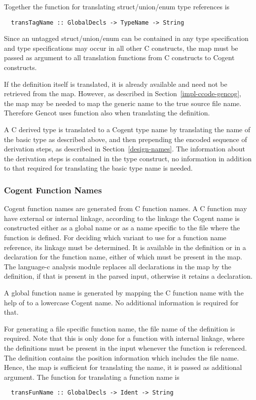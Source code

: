 Together the function for translating struct/union/enum type references is
\begin{verbatim}
  transTagName :: GlobalDecls -> TypeName -> String
\end{verbatim}

Since an untagged struct/union/enum can be contained in any type specification and type specifications
may occur in all other C constructs, the  map must be passed as argument to all translation
functions from C constructs to Cogent constructs.

If the definition itself is translated, it is already available and need not be retrieved from the map. 
However, as described in Section~\ref{impl-ccode-gencog}, the map may be needed to map the generic name
 to the true source file name. Therefore Gencot uses function  also when
translating the definition.

A C derived type is translated to a Cogent type name by translating the name of the basic type as described
above, and then prepending the encoded sequence of derivation steps, as
described in Section~\ref{design-names}. The information about the derivation steps is contained in the 
type construct, no information in addition to that required for translating the basic type name is needed.

\subsubsection{Cogent Function Names}

Cogent function names are generated from C function names. A C function may have external or internal
linkage, according to the linkage the Cogent name is constructed either as a global name or as a name specific
to the file where the function is defined. For deciding which variant to use for a function name reference,
its linkage must be determined. It is available in the definition or in a declaration for the function name,
either of which must be present in the  map. The language-c analysis module replaces all 
declarations in the map by the
definition, if that is present in the parsed input, otherwise it retains a declaration. 

A global function name is generated by mapping the C function name with the help of  to
a lowercase Cogent name. No additional information is required for that.

For generating a file specific function name, the file name of the definition is required. Note that 
this is only done for a function with internal linkage, where the definitions must be present in
the input whenever the function is referenced. The definition contains the position information
which includes the file name. Hence, the  map is sufficient for translating the name,
it is passed as additional argument. The function for translating a function name is
\begin{verbatim}
  transFunName :: GlobalDecls -> Ident -> String
\end{verbatim}

